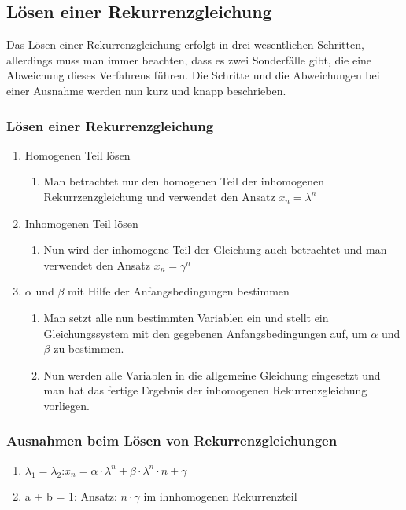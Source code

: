 \documentclass[12px,a4paper]{article}
\begin{document}
\newpage	
\subsection{Lösen einer Rekurrenzgleichung}
Das Lösen einer Rekurrenzgleichung erfolgt in drei wesentlichen Schritten, allerdings muss man immer beachten, dass es zwei Sonderfälle gibt, die eine Abweichung dieses Verfahrens führen. Die Schritte und die Abweichungen bei einer Ausnahme werden nun kurz und knapp beschrieben. \\

\subsubsection{Lösen einer Rekurrenzgleichung}
\begin{enumerate}
	\item Homogenen Teil lösen 
	\begin{enumerate}
	\item Man betrachtet nur den homogenen Teil der inhomogenen Rekurrzenzgleichung und verwendet den Ansatz $x_n = \lambda ^n$
	\end{enumerate}
	\item Inhomogenen Teil lösen
	\begin{enumerate}
	\item Nun wird der inhomogene Teil der Gleichung auch betrachtet und man verwendet den Ansatz $x_n = \gamma ^n$
	\end{enumerate}
	\item $\alpha$ und $\beta$ mit Hilfe der Anfangsbedingungen bestimmen
	\begin{enumerate}
	\item Man setzt alle nun bestimmten Variablen ein und stellt ein Gleichungssystem mit den gegebenen Anfangsbedingungen auf, um $\alpha$ und $\beta$ zu bestimmen.
	\item Nun werden alle Variablen in die allgemeine Gleichung eingesetzt und man hat das fertige Ergebnis der inhomogenen Rekurrenzgleichung vorliegen.
	\end{enumerate}
\end{enumerate}

\subsubsection{Ausnahmen beim Lösen von Rekurrenzgleichungen}
\begin{enumerate}
	\item $\lambda_1 = \lambda_2$:\quad $x_n = \alpha \cdot \lambda^n + \beta \cdot \lambda^n \cdot n + \gamma$
	\item a + b = 1: \quad Ansatz: $n \cdot \gamma$ im ihnhomogenen Rekurrenzteil
\end{enumerate}



\newpage



\end{document}
